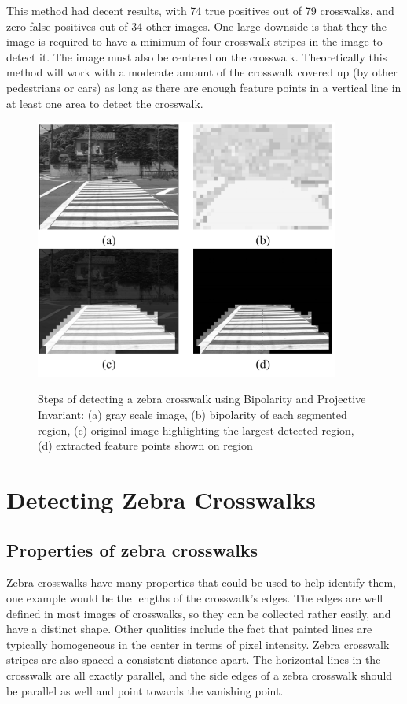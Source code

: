 \documentclass[12pt]{ucthesis}
\newcommand{\captionfonts}{\small\bf\ssp}
\begin{document}
This method had decent results, with 74 true positives out of 79 crosswalks, and zero false positives out of 34 other images. One large downside is that they the image is required to have a minimum of four crosswalk stripes in the image to detect it. The image must also be centered on the crosswalk. Theoretically this method will work with a moderate amount of the crosswalk covered up (by other pedestrians or cars) as long as there are enough feature points in a vertical line in at least one area to detect the crosswalk. 

\begin{figure}[H]
\begin{center}
\includegraphics[width=10cm]{BipolarCrosswalk.png}
\captionfonts
\caption[Bipolarity and Projective Invariant detection example]{Steps of detecting a zebra crosswalk using Bipolarity and Projective Invariant: (a) gray scale image, (b) bipolarity of each segmented region, (c) original image highlighting the largest detected region, (d) extracted feature points shown on region}
\label{fig:BipolarCrosswalk}
\end{center}
\end{figure}




\chapter{Detecting Zebra Crosswalks}

\section{Properties of zebra crosswalks}

Zebra crosswalks have many properties that could be used to help identify them, one example would be the lengths of the crosswalk's edges. The edges are well defined in most images of crosswalks, so they can be collected rather easily, and have a distinct shape. Other qualities include the fact that painted lines are typically homogeneous in the center in terms of pixel intensity. Zebra crosswalk stripes are also spaced a consistent distance apart. The horizontal lines in the crosswalk are all exactly parallel, and the side edges of a zebra crosswalk should be parallel as well and point towards the vanishing point. 
\end{document}
